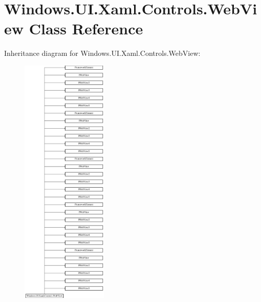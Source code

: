 \hypertarget{class_windows_1_1_u_i_1_1_xaml_1_1_controls_1_1_web_view}{}\section{Windows.\+U\+I.\+Xaml.\+Controls.\+Web\+View Class Reference}
\label{class_windows_1_1_u_i_1_1_xaml_1_1_controls_1_1_web_view}
Inheritance diagram for Windows.\+U\+I.\+Xaml.\+Controls.\+Web\+View\+:\begin{figure}[H]
\begin{center}
\leavevmode
\includegraphics[height=12.000000cm]{class_windows_1_1_u_i_1_1_xaml_1_1_controls_1_1_web_view}
\end{center}
\end{figure}
